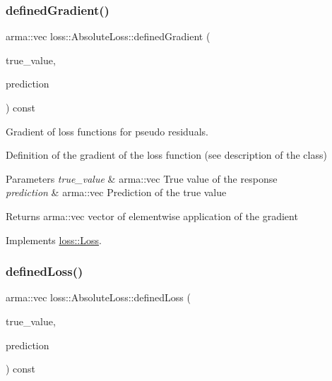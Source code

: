 \mbox{\label{classloss_1_1_absolute_loss_a1886fc8ca065c6f0a207b7a8a0f8444d}} 
\subsubsection{\texorpdfstring{defined\+Gradient()}{definedGradient()}}
{\footnotesize\ttfamily arma\+::vec loss\+::\+Absolute\+Loss\+::defined\+Gradient (\begin{DoxyParamCaption}\item[{const arma\+::vec \&}]{true\+\_\+value,  }\item[{const arma\+::vec \&}]{prediction }\end{DoxyParamCaption}) const\hspace{0.3cm}{\ttfamily [virtual]}}



Gradient of loss functions for pseudo residuals. 

Definition of the gradient of the loss function (see description of the class)


\begin{DoxyParams}{Parameters}
{\em true\+\_\+value} & {\ttfamily arma\+::vec} True value of the response \\
\hline
{\em prediction} & {\ttfamily arma\+::vec} Prediction of the true value\\
\hline
\end{DoxyParams}
\begin{DoxyReturn}{Returns}
{\ttfamily arma\+::vec} vector of elementwise application of the gradient 
\end{DoxyReturn}


Implements \mbox{\hyperlink{classloss_1_1_loss_a267a4de70747ade4b2d84ce35a448979}{loss\+::\+Loss}}.

\mbox{\label{classloss_1_1_absolute_loss_acfef6f0de3cfcccebd4bbfc04133cf1e}} 
\subsubsection{\texorpdfstring{defined\+Loss()}{definedLoss()}}
{\footnotesize\ttfamily arma\+::vec loss\+::\+Absolute\+Loss\+::defined\+Loss (\begin{DoxyParamCaption}\item[{const arma\+::vec \&}]{true\+\_\+value,  }\item[{const arma\+::vec \&}]{prediction }\end{DoxyParamCaption}) const\hspace{0.3cm}{\ttfamily [virtual]}}



